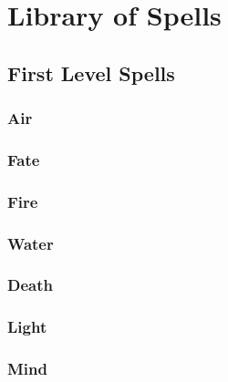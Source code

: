 \chapter{Library of Spells}

\section{First Level Spells}

\begin{multicols}{2}

\subsection{Air}


\subsection{Fate}


\subsection{Fire}


\subsection{Water}


\subsection{Death}


\subsection{Light}


\subsection{Mind}


\end{multicols}

